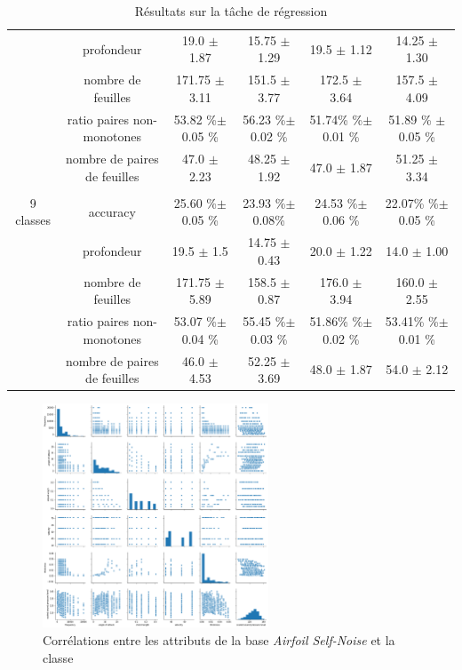 \documentclass[a4paper]{article}
\begin{document}
\begin{table}
{\begin{tabular}{|*{6}{c|}}
     & profondeur & 19.0 $\pm$ 1.87 & 15.75 $\pm$ 1.29& 19.5 $\pm$ 1.12& 14.25 $\pm$ 1.30 \\

     & nombre de feuilles  & 171.75 $\pm$ 3.11 & 151.5 $\pm$ 3.77 & 172.5 $\pm$ 3.64 & 157.5 $\pm$ 4.09 \\

     & ratio paires non-monotones  & 53.82 \%$\pm$ 0.05 \%& 56.23 \%$\pm$ 0.02 \%& 51.74\% \%$\pm$ 0.01 \%& 51.89 \% $\pm$ 0.05 \% \\

     & nombre de paires de feuilles & 47.0 $\pm$ 2.23 & 48.25 $\pm$ 1.92 & 47.0 $\pm$ 1.87& 51.25 $\pm$ 3.34\\

    & & & & & \\

     9 classes & accuracy  & 25.60 \%$\pm$ 0.05 \%  & 23.93 \%$\pm$ 0.08\%  & 24.53 \%$\pm$ 0.06 \% & 22.07\% \%$\pm$ 0.05 \% \\

     & profondeur  & 19.5 $\pm$ 1.5 & 14.75 $\pm$ 0.43 & 20.0 $\pm$ 1.22 & 14.0
     $\pm$ 1.00  \\

     & nombre de feuilles  & 171.75 $\pm$ 5.89 & 158.5 $\pm$ 0.87 & 176.0 $\pm$
     3.94 & 160.0 $\pm$ 2.55 \\

     & ratio paires non-monotones  & 53.07 \%$\pm$ 0.04 \%& 55.45 \%$\pm$ 0.03
     \%& 51.86\% \%$\pm$ 0.02 \%& 53.41\% \%$\pm$ 0.01 \% \\

     & nombre de paires de feuilles  & 46.0 $\pm$ 4.53 & 52.25 $\pm$ 3.69& 48.0
     $\pm$ 1.87 & 54.0 $\pm$ 2.12 \\
    \hline

\end{tabular}}
\caption{Résultats sur la tâche de régression}
\label{tab:resultats-regression}
\end{table}

\begin{figure}[H]
	\center 
	\includegraphics[width=0.6\textwidth]{images/airfoil.png}
    \caption{Corrélations entre les attributs de la base \emph{Airfoil
    Self-Noise}
    et la classe}
    \label{img:airfoil}
\end{figure}
\end{document}
